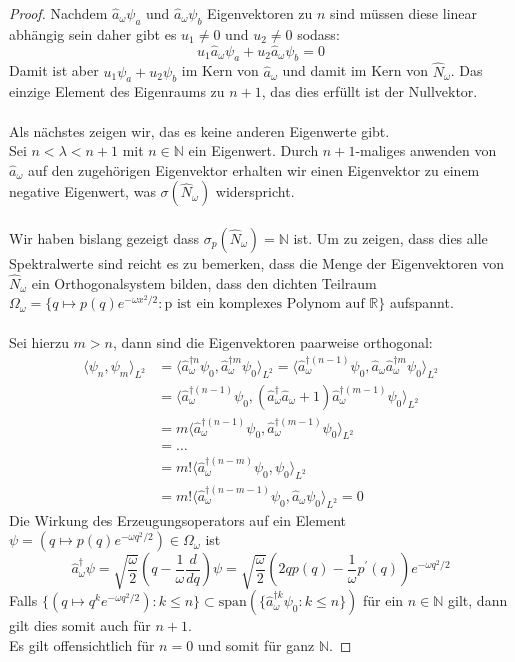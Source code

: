 \documentclass[11pt,a4paper,leqno]{report}
\numberwithin{equation}{chapter}
\begin{document}
\begin{proof}
Nachdem $\hat{a}_\omega\psi_a$ und $\hat{a}_\omega\psi_b$ Eigenvektoren zu $n$ sind m\"ussen diese linear abh\"angig sein daher gibt es $u_1\neq0$ und $u_2\neq 0$ sodass:
\begin{equation*}
	u_1\hat{a}_\omega\psi_a+u_2\hat{a}_\omega\psi_b=0
\end{equation*}
Damit ist aber $u_1\psi_a+u_2\psi_b$ im Kern von $\hat{a}_\omega$ und damit im Kern von $\hat{N}_\omega$.
Das einzige Element des Eigenraums zu $n+1$, das dies erf\"ullt ist der Nullvektor.\\
\\
Als n\"achstes zeigen wir, das es keine anderen Eigenwerte gibt.\\
Sei $n<\lambda<n+1$ mit $n\in\mathbb{N}$ ein Eigenwert. Durch $n+1$-maliges anwenden von $\hat{a}_\omega$ auf den zugeh\"origen Eigenvektor erhalten wir einen Eigenvektor zu einem negative Eigenwert, was $\sigma(\hat{N}_\omega)$ widerspricht.\\
\\
Wir haben bislang gezeigt dass $\sigma_p(\hat{N}_\omega)=
\mathbb{N}$ ist. Um zu zeigen, dass dies alle Spektralwerte sind reicht es zu bemerken, dass die Menge der Eigenvektoren von $\hat{N}_\omega$ ein Orthogonalsystem bilden, dass den dichten Teilraum $\Omega_\omega=\{q\mapsto p(q)e^{-\omega x^2 / 2}: \text{p ist ein komplexes Polynom auf $\mathbb{R}$}\}$ aufspannt.
\\
\\
Sei hierzu $m>n$, dann sind die Eigenvektoren paarweise orthogonal: 
\begin{align*}
	\langle \psi_n,\psi_m\rangle_{L^2}&=
	\langle \hat{a}_\omega^{\dagger n}\psi_0,\hat{a}_\omega^{\dagger m}\psi_0\rangle_{L^2}=
	\langle \hat{a}_\omega^{\dagger (n-1)}\psi_0,\hat{a}_\omega\hat{a}_\omega^{\dagger m}\psi_0\rangle_{L^2}\\&=
	\langle \hat{a}_\omega^{\dagger (n-1)}\psi_0,(\hat{a}_\omega^\dagger \hat{a}_\omega +1)\hat{a}_\omega^{\dagger (m-1)}\psi_0\rangle_{L^2}\\&= m
	\langle \hat{a}_\omega^{\dagger (n-1)}\psi_0,\hat{a}_\omega^{\dagger (m-1)}\psi_0\rangle_{L^2}\\&=\dots\\&= m!
	\langle \hat{a}_\omega^{\dagger (n-m)}\psi_0,\psi_0\rangle_{L^2}\\&= m!
	\langle \hat{a}_\omega^{\dagger (n-m-1)}\psi_0,\hat{a}_\omega\psi_0\rangle_{L^2}=0
\end{align*}
Die Wirkung des Erzeugungsoperators auf ein Element\\ $\psi=(q\mapsto p(q)e^{-\omega q^2/2})\in\Omega_\omega$ ist
\begin{equation*}
\hat{a}_\omega^\dagger\psi  = \sqrt{\frac{\omega}{2}}(q - \frac{1}{\omega}\frac{d}{dq})\psi = \sqrt{\frac{\omega}{2}}(2qp(q)-\frac{1}{\omega}p^\prime(q) )e^{-\omega q^2/2}
\end{equation*}
Falls $\{(q\mapsto q^ke^{-\omega q^2/2}): k\leq n\}\subset \text{span}(\{\hat{a}_\omega^{\dagger k}\psi_0: k\leq n\})$ f\"ur ein $n\in\mathbb{N}$ gilt, dann gilt dies somit auch f\"ur $n+1$.\\Es gilt offensichtlich f\"ur $n=0$ und somit f\"ur ganz $\mathbb{N}$.
\end{proof}
\end{document}
